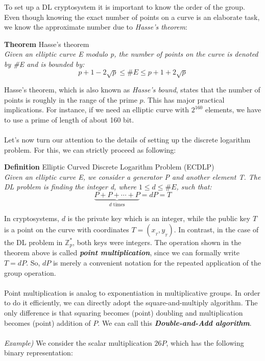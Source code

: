 \documentclass[11pt, a4paper]{article}
\begin{document}
\newpage
\hfill\break
To set up a DL cryptosystem it is important to know the order of the group. Even though knowing the exact number of points on a curve is an elaborate task, we know the approximate number due to \textit{Hasse's theorem}:
\begin{framed}
    \hfill\break\textbf{Theorem} Hasse's theorem\\
    \textit{Given an elliptic curve E modulo p, the number of points on the curve is denoted by \#E and is bounded \nolinebreak by:}
    $$p+1-2\sqrt{p}\le\#E\le p+1+2\sqrt{p}$$
\end{framed}
Hasse's theorem, which is also known as \textit{Hasse's bound}, states that the number of points is roughly in the range of the prime $p$. This has major practical implications. For instance, if we need an elliptic curve with $2^{160}$ elements, we have to use a prime of length of about 160 bit.\\\\
Let's now turn our attention to the details of setting up the discrete logarithm problem. For this, we can strictly proceed as following:
\begin{framed}
    \hfill\break\textbf{Definition} Elliptic Curved Discrete Logarithm Problem (ECDLP)\\
    \textit{Given an elliptic curve E, we consider a generator P and another element T. The DL problem is finding the integer d, where $1\le d\le\#E$, such that:}
    $$\underbrace{P+P+\cdots+P}_{d\text{ times}}=dP=T$$
\end{framed}
In cryptosystems, $d$ is the private key which is an integer, while the public key $T$ is a point on the curve with coordinates $T=(x_{_T},y_{_T})$. In contrast, in the case of the DL problem in $\mathbb{Z}_p^*$, both keys were integers. The operation shown in the theorem above is called \textit{\textbf{point multiplication}}, since we can formally write $T=dP$. So, $dP$ is merely a convenient notation for the repeated application of the group operation.\\\\
Point multiplication is analog to exponentiation in multiplicative groups. In order to do it efficiently, we can directly adopt the square-and-multiply algorithm. The only difference is that squaring becomes (point) doubling and multiplication becomes (point) addition of $P$. We can call this \textbf{\textit{Double-and-Add algorithm}}.\\\\
\textit{Example)} We consider the scalar multiplication $26P$, which has the following binary representation:
\end{document}
